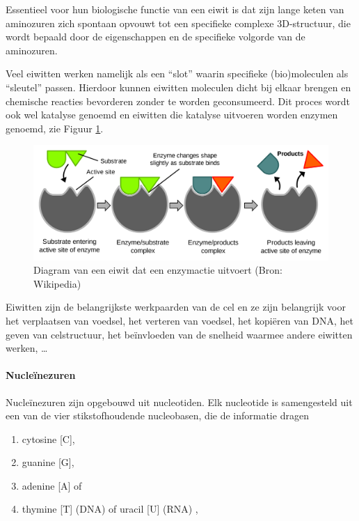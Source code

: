 \documentclass[
  11pt,
]{book}
\providecommand{\tightlist}{%
  \setlength{\itemsep}{0pt}\setlength{\parskip}{0pt}}
\begin{document}
Essentieel voor hun biologische functie van een eiwit is dat zijn lange keten van aminozuren zich spontaan opvouwt tot een specifieke complexe 3D-structuur, die wordt bepaald door de eigenschappen en de specifieke volgorde van de aminozuren.

Veel eiwitten werken namelijk als een ``slot'' waarin specifieke (bio)moleculen als ``sleutel'' passen. Hierdoor kunnen eiwitten moleculen dicht bij elkaar brengen en chemische reacties bevorderen zonder te worden geconsumeerd. Dit proces wordt ook wel katalyse genoemd en eiwitten die katalyse uitvoeren worden enzymen genoemd, zie Figuur \ref{fig:enzyme}.

\begin{figure}

{\centering \includegraphics[width=0.5\linewidth]{./figs/EnzymePadlockKey} 

}

\caption{Diagram van een eiwit dat een enzymactie uitvoert (Bron: Wikipedia)}\label{fig:enzyme}
\end{figure}

Eiwitten zijn de belangrijkste werkpaarden van de cel en ze zijn belangrijk voor het verplaatsen van voedsel, het verteren van voedsel, het kopiëren van DNA, het geven van celstructuur, het beïnvloeden van de snelheid waarmee andere eiwitten werken, \ldots{}

\hypertarget{sectionNucleicAcids}{%
\paragraph{Nucleïnezuren}\label{sectionNucleicAcids}}

Nucleïnezuren zijn opgebouwd uit nucleotiden. Elk nucleotide is samengesteld uit een van de vier stikstofhoudende nucleobasen, die de informatie dragen

\begin{enumerate}
\def\labelenumi{\arabic{enumi}.}
\tightlist
\item
  cytosine {[}C{]},
\item
  guanine {[}G{]},
\item
  adenine {[}A{]} of
\item
  thymine {[}T{]} (DNA) of uracil {[}U{]} (RNA) ,
\end{enumerate}
\end{document}
